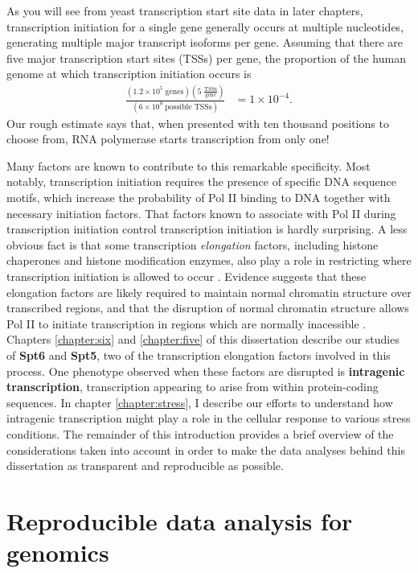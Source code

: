 As you will see from yeast transcription start site data in later chapters, transcription initiation for a single gene generally occurs at multiple nucleotides, generating multiple major transcript isoforms per gene.
Assuming that there are five major transcription start sites (TSSs) per gene, the proportion of the human genome at which transcription initiation occurs is
\begin{align*}
    \frac{\left(1.2 \times 10^5 \; \text{genes}\right) \left(5 \; \frac{\text{TSSs}}{\text{gene}} \right)}
         {\left(6 \times 10^9 \; \text{possible TSSs} \right)}
    &= 1 \times 10^{-4}.
\end{align*}
Our rough estimate says that, when presented with ten thousand positions to choose from, RNA polymerase starts transcription from only one!

Many factors are known to contribute to this remarkable specificity.
Most notably, transcription initiation requires the presence of specific DNA sequence motifs, which increase the probability of Pol II binding to DNA together with necessary initiation factors.
That factors known to associate with Pol II during transcription initiation control transcription initiation is hardly surprising.
A less obvious fact is that some transcription \textit{elongation} factors, including histone chaperones and histone modification enzymes, also play a role in restricting where transcription initiation is allowed to occur \citep{kaplan2003, cheung2008, hennig2013}.
Evidence suggests that these elongation factors are likely required to maintain normal chromatin structure over transcribed regions, and that the disruption of normal chromatin structure allows Pol II to initiate transcription in regions which are normally inacessible \citep{}.
Chapters \ref{chapter:six} and \ref{chapter:five} of this dissertation describe our studies of \textbf{Spt6} and \textbf{Spt5}, two of the transcription elongation factors involved in this process.
One phenotype observed when these factors are disrupted is \textbf{intragenic transcription}, transcription appearing to arise from within protein-coding sequences.
In chapter \ref{chapter:stress}, I describe our efforts to understand how intragenic transcription might play a role in the cellular response to various stress conditions.
The remainder of this introduction provides a brief overview of the considerations taken into account in order to make the data analyses behind this dissertation as transparent and reproducible as possible.

\section{Reproducible data analysis for genomics}

